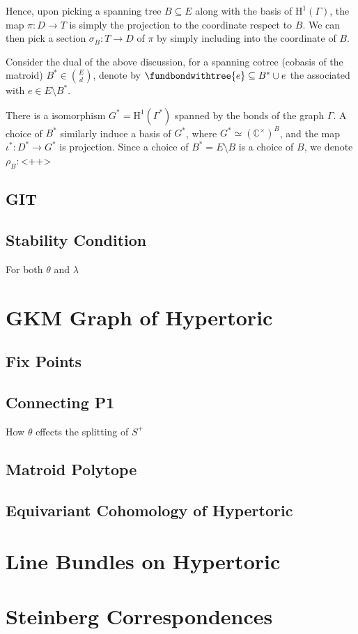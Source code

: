 \documentclass[b5paper]{article}
\newcommand{\del}{\setminus}
\newcommand{\HH}{\mathrm{H}}
\begin{document}
Hence, upon picking a spanning tree $B\subseteq E$ along with the basis of $\HH^1(\Gamma)$, the map $\pi:D\rightarrow T$ is simply the projection to the coordinate respect to $B$. We can then pick a section $\sigma_B:T\rightarrow D$ of $\pi$ by simply including into the coordinate of $B$.

Consider the dual of the above discussion, for a spanning cotree (cobasis of the matroid) $B^*\in \binom{E}{d}$, denote by $\fundbondwithtree{e}\subseteq B^*\cup e$ the  associated with $e\in E\del B^*$.

There is a isomorphism $G^*=\HH^1(\Gamma^*)$ spanned by the bonds of the graph $\Gamma$.
A choice of $B^*$ similarly induce a basis of $G^*$, where $G^*\simeq (\mathbb{C}^\times )^B$, and the map $\iota^*:D^*\rightarrow G^*$ is projection. Since a choice of $B^*=E\del B$ is a choice of $B$, we denote $\rho_B:$<++>


\subsection{GIT}
\subsection{Stability Condition}
For both $\theta$ and $\lambda$
\section{GKM Graph of Hypertoric}
\subsection{Fix Points}
\subsection{Connecting P1}
How $\theta$ effects the splitting of $S^+$
\subsection{Matroid Polytope}
\subsection{Equivariant Cohomology of Hypertoric}
\section{Line Bundles on Hypertoric}
\section{Steinberg Correspondences}
\end{document}
